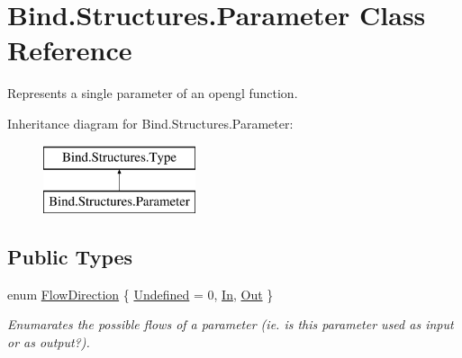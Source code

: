 \hypertarget{class_bind_1_1_structures_1_1_parameter}{
\section{Bind.Structures.Parameter Class Reference}
\label{class_bind_1_1_structures_1_1_parameter}
}


Represents a single parameter of an opengl function.  


Inheritance diagram for Bind.Structures.Parameter:\begin{figure}[H]
\begin{center}
\leavevmode
\includegraphics[height=2.000000cm]{class_bind_1_1_structures_1_1_parameter}
\end{center}
\end{figure}
\subsection*{Public Types}
\begin{DoxyCompactItemize}
\item 
enum \hyperlink{class_bind_1_1_structures_1_1_parameter_a610a669b105a837fccb10d1869ea3876}{FlowDirection} \{ \hyperlink{class_bind_1_1_structures_1_1_parameter_a610a669b105a837fccb10d1869ea3876}{Undefined} =  0, 
\hyperlink{class_bind_1_1_structures_1_1_parameter_a610a669b105a837fccb10d1869ea3876}{In}, 
\hyperlink{class_bind_1_1_structures_1_1_parameter_a610a669b105a837fccb10d1869ea3876}{Out}
 \}
\begin{DoxyCompactList}\small\item\em Enumarates the possible flows of a parameter (ie. is this parameter used as input or as output?). \item\end{DoxyCompactList}\end{DoxyCompactItemize}
